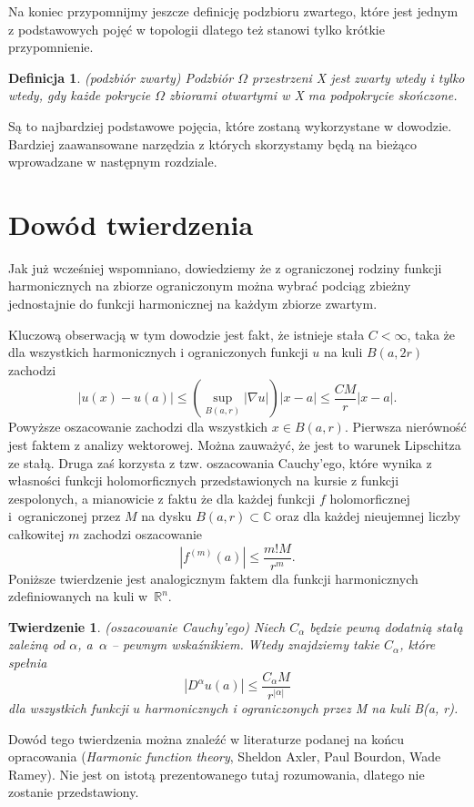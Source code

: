 \documentclass[12pt]{article}
\newtheorem{theorem}{Twierdzenie}
\newtheorem{definition}{Definicja}
\begin{document}
Na koniec przypomnijmy jeszcze definicję podzbioru zwartego, które jest jednym z podstawowych pojęć w topologii dlatego też stanowi tylko krótkie przypomnienie. 
\begin{definition}{(podzbiór zwarty)}
Podzbiór $\Omega$ przestrzeni X jest zwarty wtedy i tylko wtedy, gdy każde pokrycie $\Omega$ zbiorami otwartymi w X ma podpokrycie skończone. 
\end{definition}

Są to najbardziej podstawowe pojęcia, które zostaną wykorzystane w dowodzie.
Bardziej zaawansowane narzędzia z których skorzystamy będą na bieżąco wprowadzane w następnym rozdziale.
\section{Dowód twierdzenia}
 Jak już wcześniej wspomniano, dowiedziemy że z ograniczonej rodziny funkcji harmonicznych na zbiorze ograniczonym można wybrać podciąg zbieżny jednostajnie do funkcji harmonicznej na każdym zbiorze zwartym.
 
Kluczową obserwacją w tym dowodzie jest fakt, że istnieje stała $C < \infty$, taka że dla wszystkich harmonicznych i ograniczonych funkcji $u$ na kuli $B(a, 2r)$ zachodzi
\begin{equation}
\label{eq}
|u(x)-u(a)|\leq (\sup_{B(a,r)}|\nabla u |)|x-a| \leq \dfrac{CM}{r}|x-a|.
\end{equation}
Powyższe oszacowanie zachodzi dla wszystkich $x \in B(a, r)$. Pierwsza nierówność jest faktem z analizy wektorowej. Można zauważyć, że jest to warunek Lipschitza ze stałą. Druga zaś korzysta z tzw. oszacowania Cauchy'ego, które wynika z własności funkcji holomorficznych przedstawionych na kursie z funkcji zespolonych, a mianowicie z faktu że dla każdej funkcji $f$ holomorficznej i~ograniczonej przez $M$ na dysku $B(a,r)\subset \mathbb{C}$ oraz dla każdej nieujemnej liczby całkowitej $m$ zachodzi oszacowanie 
$$|f^{(m)}(a)|\leq \dfrac{m! M}{r^m}.$$
Poniższe twierdzenie jest analogicznym faktem dla funkcji harmonicznych zdefiniowanych na kuli w~$\mathbb{R}^n$.
\begin{theorem}{(oszacowanie Cauchy'ego)}
Niech $C_{\alpha}$ będzie pewną dodatnią stałą zależną od $\alpha$, a~$\alpha$ -- pewnym wskaźnikiem. Wtedy znajdziemy takie $C_{\alpha}$, które spełnia 
\begin{equation*}
|D^{\alpha}u(a)| \leq \dfrac{C_{\alpha}M}{r^{|\alpha|}}
\end{equation*}
dla wszystkich funkcji $u$ harmonicznych i ograniczonych przez M na kuli  B(a, r).
\end{theorem} 
Dowód tego twierdzenia można znaleźć w literaturze podanej na końcu opracowania (\textit{Harmonic function theory}, Sheldon Axler, Paul Bourdon, Wade Ramey). Nie jest on istotą prezentowanego tutaj rozumowania, dlatego nie zostanie przedstawiony.
\end{document}
